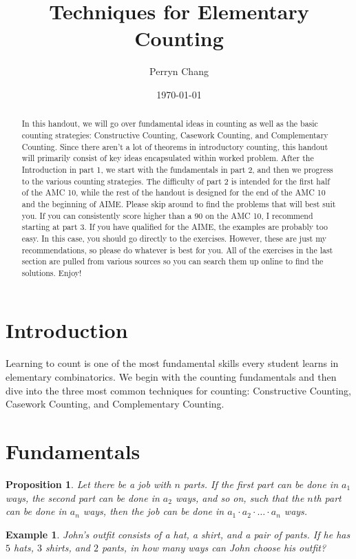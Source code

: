 \documentclass[letterpaper]{article}
\title{Techniques for Elementary Counting}
\author{Perryn Chang}
\date{\today}
\newtheorem{prop}[thm]{Proposition}
\newtheorem{example}[thm]{Example}
\theoremstyle{remark}
\theoremstyle{definition}
\begin{document}
\maketitle

\begin{abstract}
In this handout, we will go over fundamental ideas in counting as well as the basic counting strategies: Constructive Counting, Casework Counting, and Complementary Counting. Since there aren't a lot of theorems in introductory counting, this handout will primarily consist of key ideas encapsulated within worked problem. After the Introduction in part 1, we start with the fundamentals in part 2, and then we progress to the various counting strategies. The difficulty of part 2 is intended for the first half of the AMC 10, while the rest of the handout is designed for the end of the AMC 10 and the beginning of AIME. Please skip around to find the problems that will best suit you. If you can consistently score higher than a $90$ on the AMC 10, I recommend starting at part 3. If you have qualified for the AIME, the examples are probably too easy. In this case, you should go directly to the exercises. However, these are just my recommendations, so please do whatever is best for you. All of the exercises in the last section are pulled from various sources so you can search them up online to find the solutions. Enjoy!
\end{abstract}

\section{Introduction}

Learning to count is one of the most fundamental skills every student learns in elementary combinatorics. We begin with the counting fundamentals and then dive into the three most common techniques for counting: Constructive Counting, Casework Counting, and Complementary Counting.

\section{Fundamentals}
\label{sec:examples}

\bigskip

\begin{mdframed}

\begin{prop}
Let there be a job with $n$ parts. If the first part can be done in $a_1$ ways, the second part can be done in $a_2$ ways, and so on, such that the $n$th part can be done in $a_n$ ways, then the job can be done in $a_1 \cdot a_2 \cdot \dots \cdot a_n$ ways.

\end{prop}
\end{mdframed}
\bigskip
\begin{example}
John's outfit consists of a hat, a shirt, and a pair of pants. If he has $5$ hats, $3$ shirts, and $2$ pants, in how many ways can John choose his outfit?
\end{example}
\end{document}
